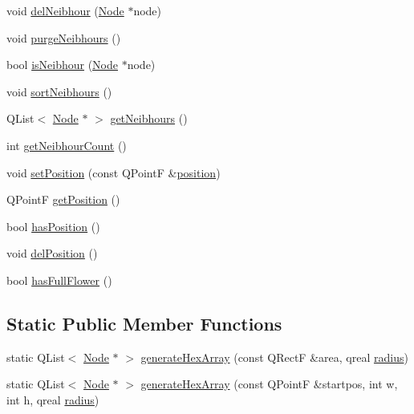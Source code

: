 \begin{DoxyCompactItemize}
void \hyperlink{class_node_a18f47997870bbf1d56bbe9814e566425}{del\+Neibhour} (\hyperlink{class_node}{Node} $\ast$node)
\item 
void \hyperlink{class_node_a2e7ae32f9ae0addc356281d9593ef5ba}{purge\+Neibhours} ()
\item 
bool \hyperlink{class_node_aa0e6fa73b1c95c5405dee1e10ff1881f}{is\+Neibhour} (\hyperlink{class_node}{Node} $\ast$node)
\item 
void \hyperlink{class_node_ac0f32d921f5849c5edce7c76e245b516}{sort\+Neibhours} ()
\item 
Q\+List$<$ \hyperlink{class_node}{Node} $\ast$ $>$ \hyperlink{class_node_aef487f3aed9670249dcd2b07406d48dd}{get\+Neibhours} ()
\item 
int \hyperlink{class_node_a5a05aa880682f3021bdbb5d7cad70641}{get\+Neibhour\+Count} ()
\item 
void \hyperlink{class_node_a4e3af9f1b628ef5458e6097a5624b144}{set\+Position} (const Q\+Point\+F \&\hyperlink{class_node_af0201de36fd117a362e5f52fd6d75cde}{position})
\item 
Q\+Point\+F \hyperlink{class_node_aa7e8b720e25e39a0719d8ba03bf69cf4}{get\+Position} ()
\item 
bool \hyperlink{class_node_a0ea70d198511ebbeb027fa8d632c974d}{has\+Position} ()
\item 
void \hyperlink{class_node_a2b99358139b61f8ff4b0c85055bf1f22}{del\+Position} ()
\item 
bool \hyperlink{class_node_ada64122ca79cadfc50518871e64fc208}{has\+Full\+Flower} ()
\end{DoxyCompactItemize}
\subsection*{Static Public Member Functions}
\begin{DoxyCompactItemize}
\item 
static Q\+List$<$ \hyperlink{class_node}{Node} $\ast$ $>$ \hyperlink{class_node_a139278bba2f9090857f01d3339a87753}{generate\+Hex\+Array} (const Q\+Rect\+F \&area, qreal \hyperlink{class_node_abc1468f478d90c8d205b5753eacb1f3b}{radius})
\item 
static Q\+List$<$ \hyperlink{class_node}{Node} $\ast$ $>$ \hyperlink{class_node_ac35036093a7bda3b0d70224418c5b1ef}{generate\+Hex\+Array} (const Q\+Point\+F \&startpos, int w, int h, qreal \hyperlink{class_node_abc1468f478d90c8d205b5753eacb1f3b}{radius})
\end{DoxyCompactItemize}
